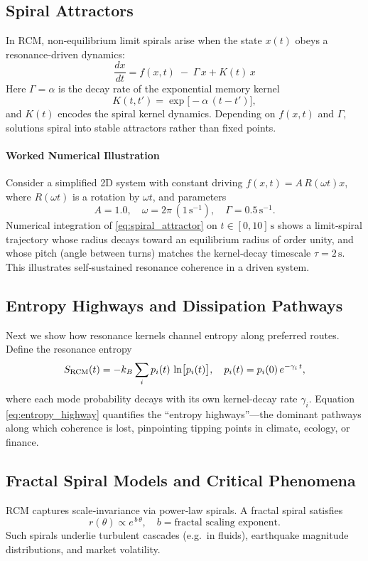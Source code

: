 \subsection{Spiral Attractors}
In RCM, non‐equilibrium limit spirals arise when the state $x(t)$ obeys a resonance‐driven dynamics:
\begin{equation}
  \frac{dx}{dt}
  = f(x,t)\;-\;\Gamma\,x
  + K(t)\,x
  \label{eq:spiral_attractor}
\end{equation}
Here $\Gamma=\alpha$ is the decay rate of the exponential memory kernel
\[
  K(t,t') = \exp\bigl[-\alpha\,(t - t')\bigr],
\]
and $K(t)$ encodes the spiral kernel dynamics. Depending on $f(x,t)$ and $\Gamma$, solutions spiral into stable attractors rather than fixed points.

\paragraph{Worked Numerical Illustration}
Consider a simplified 2D system with constant driving $f(x,t)=A\,R(\omega t)x$, where $R(\omega t)$ is a rotation by $\omega t$, and parameters
\[
  A = 1.0,\quad \omega = 2\pi\,(1\,\text{s}^{-1}),\quad \Gamma = 0.5\,\text{s}^{-1}.
\]
Numerical integration of \eqref{eq:spiral_attractor} on $t\in[0,10]\,\text{s}$ shows a limit‐spiral trajectory whose radius decays toward an equilibrium radius of order unity, and whose pitch (angle between turns) matches the kernel‐decay timescale $\tau=2\,\text{s}$. This illustrates self‐sustained resonance coherence in a driven system.

\subsection{Entropy Highways and Dissipation Pathways}
Next we show how resonance kernels channel entropy along preferred routes. Define the resonance entropy
\begin{equation}
  S_{\rm RCM}(t)
  = -k_B \sum_i p_i(t)\,\ln\bigl[p_i(t)\bigr],
  \quad
  p_i(t) = p_i(0)\,e^{-\gamma_i\,t},
  \label{eq:entropy_highway}
\end{equation}
where each mode probability decays with its own kernel‐decay rate $\gamma_i$. Equation \eqref{eq:entropy_highway} quantifies the “entropy highways”—the dominant pathways along which coherence is lost, pinpointing tipping points in climate, ecology, or finance.

\subsection{Fractal Spiral Models and Critical Phenomena}
RCM captures scale‐invariance via power‐law spirals. A fractal spiral satisfies
\begin{equation}
  r(\theta) \propto e^{\,b\,\theta},
  \quad
  b = \text{fractal scaling exponent}.
  \label{eq:fractal_spiral}
\end{equation}
Such spirals underlie turbulent cascades (e.g.\ in fluids), earthquake magnitude distributions, and market volatility.

